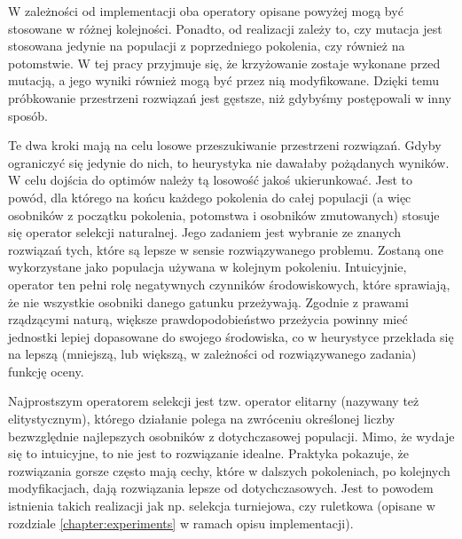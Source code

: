 \documentclass[twoside]{iisthesis}
\begin{document}
W zależności od implementacji oba operatory opisane powyżej mogą być stosowane w różnej kolejności.
Ponadto, od realizacji zależy to, czy mutacja jest stosowana jedynie na populacji z poprzedniego pokolenia, czy również na potomstwie.
W tej pracy przyjmuje się, że krzyżowanie zostaje wykonane przed mutacją, a jego wyniki również mogą być przez nią modyfikowane.
Dzięki temu próbkowanie przestrzeni rozwiązań jest gęstsze, niż gdybyśmy postępowali w inny sposób.

Te dwa kroki mają na celu losowe przeszukiwanie przestrzeni rozwiązań.
Gdyby ograniczyć się jedynie do nich, to heurystyka nie dawałaby pożądanych wyników.
W celu dojścia do optimów należy tą losowość jakoś ukierunkować.
Jest to powód, dla którego na końcu każdego pokolenia do całej populacji (a więc osobników z początku pokolenia, potomstwa i osobników zmutowanych) stosuje się operator selekcji naturalnej.
Jego zadaniem jest wybranie ze znanych rozwiązań tych, które są lepsze w sensie rozwiązywanego problemu.
Zostaną one wykorzystane jako populacja używana w kolejnym pokoleniu. 
Intuicyjnie, operator ten pełni rolę negatywnych czynników środowiskowych, które sprawiają, że nie wszystkie osobniki danego gatunku przeżywają.
Zgodnie z prawami rządzącymi naturą, większe prawdopodobieństwo przeżycia powinny mieć jednostki lepiej dopasowane do swojego środowiska, co w heurystyce przekłada się na lepszą (mniejszą, lub większą, w zależności od rozwiązywanego zadania) funkcję oceny.

Najprostszym operatorem selekcji jest tzw. operator elitarny (nazywany też elitystycznym), którego działanie polega na zwróceniu określonej liczby bezwzględnie najlepszych osobników z dotychczasowej populacji.
Mimo, że wydaje się to intuicyjne, to nie jest to rozwiązanie idealne.
Praktyka pokazuje, że rozwiązania gorsze często mają cechy, które w dalszych pokoleniach, po kolejnych modyfikacjach, dają rozwiązania lepsze od dotychczasowych.
Jest to powodem istnienia takich realizacji jak np. selekcja turniejowa, czy ruletkowa (opisane w rozdziale \ref{chapter:experiments} w ramach opisu implementacji).
\end{document}
